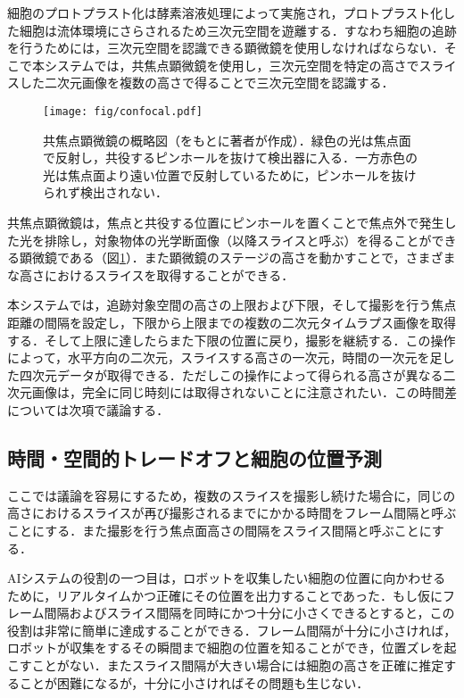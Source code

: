     細胞のプロトプラスト化は酵素溶液処理によって実施され，プロトプラスト化した細胞は流体環境にさらされるため三次元空間を遊離する．すなわち細胞の追跡を行うためには，三次元空間を認識できる顕微鏡を使用しなければならない．そこで本システムでは，共焦点顕微鏡\cite{paddock2000principles}を使用し，三次元空間を特定の高さでスライスした二次元画像を複数の高さで得ることで三次元空間を認識する．

    \begin{figure}[t]
        \centering
        \texttt{[image: fig/confocal.pdf]}
        \caption[共焦点顕微鏡の概略図]{共焦点顕微鏡の概略図（\cite{paddock2000principles}をもとに著者が作成）．緑色の光は焦点面で反射し，共役するピンホールを抜けて検出器に入る．一方赤色の光は焦点面より遠い位置で反射しているために，ピンホールを抜けられず検出されない．}
        \label{fig:confocal_microscope}
    \end{figure}

    共焦点顕微鏡は，焦点と共役する位置にピンホールを置くことで焦点外で発生した光を排除し，対象物体の光学断面像（以降スライスと呼ぶ）を得ることができる顕微鏡である（図\ref{fig:confocal_microscope}）．また顕微鏡のステージの高さを動かすことで，さまざまな高さにおけるスライスを取得することができる．

    本システムでは，追跡対象空間の高さの上限および下限，そして撮影を行う焦点距離の間隔を設定し，下限から上限までの複数の二次元タイムラプス画像を取得する．そして上限に達したらまた下限の位置に戻り，撮影を継続する．この操作によって，水平方向の二次元，スライスする高さの一次元，時間の一次元を足した四次元データが取得できる．ただしこの操作によって得られる高さが異なる二次元画像は，完全に同じ時刻には取得されないことに注意されたい．この時間差については次項で議論する．

    \subsection{時間・空間的トレードオフと細胞の位置予測}

    ここでは議論を容易にするため，複数のスライスを撮影し続けた場合に，同じの高さにおけるスライスが再び撮影されるまでにかかる時間をフレーム間隔と呼ぶことにする．また撮影を行う焦点面高さの間隔をスライス間隔と呼ぶことにする．

    AIシステムの役割の一つ目は，ロボットを収集したい細胞の位置に向かわせるために，リアルタイムかつ正確にその位置を出力することであった．もし仮にフレーム間隔およびスライス間隔を同時にかつ十分に小さくできるとすると，この役割は非常に簡単に達成することができる．フレーム間隔が十分に小さければ，ロボットが収集をするその瞬間まで細胞の位置を知ることができ，位置ズレを起こすことがない．またスライス間隔が大きい場合には細胞の高さを正確に推定することが困難になるが，十分に小さければその問題も生じない．

